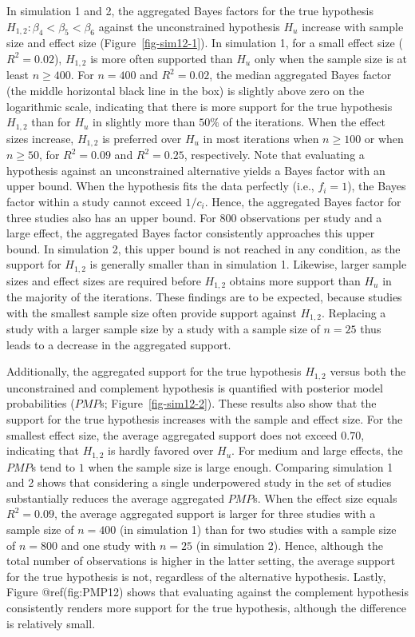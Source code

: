 \documentclass[
  authoryear,
  preprint,
  5p,
  twocolumn]{elsarticle}
\begin{document}
In simulation 1 and 2, the aggregated Bayes factors for the true
hypothesis \(H_{1,2}: \beta_4 < \beta_5 < \beta_6\) against the
unconstrained hypothesis \(H_u\) increase with sample size and effect
size (Figure~\ref{fig-sim12-1}). In simulation 1, for a small effect
size (\(R^2 = 0.02\)), \(H_{1,2}\) is more often supported than \(H_u\)
only when the sample size is at least \(n \geq 400\). For \(n = 400\)
and \(R^2 = 0.02\), the median aggregated Bayes factor (the middle
horizontal black line in the box) is slightly above zero on the
logarithmic scale, indicating that there is more support for the true
hypothesis \(H_{1,2}\) than for \(H_u\) in slightly more than \(50\%\)
of the iterations. When the effect sizes increase, \(H_{1,2}\) is
preferred over \(H_u\) in most iterations when \(n \geq 100\) or when
\(n \geq 50\), for \(R^2 = 0.09\) and \(R^2 = 0.25\), respectively. Note
that evaluating a hypothesis against an unconstrained alternative yields
a Bayes factor with an upper bound. When the hypothesis fits the data
perfectly (i.e., \(f_i = 1\)), the Bayes factor within a study cannot
exceed \(1/c_i\). Hence, the aggregated Bayes factor for three studies
also has an upper bound. For \(800\) observations per study and a large
effect, the aggregated Bayes factor consistently approaches this upper
bound. In simulation 2, this upper bound is not reached in any
condition, as the support for \(H_{1,2}\) is generally smaller than in
simulation 1. Likewise, larger sample sizes and effect sizes are
required before \(H_{1,2}\) obtains more support than \(H_u\) in the
majority of the iterations. These findings are to be expected, because
studies with the smallest sample size often provide support against
\(H_{1,2}\). Replacing a study with a larger sample size by a study with
a sample size of \(n = 25\) thus leads to a decrease in the aggregated
support.

Additionally, the aggregated support for the true hypothesis \(H_{1,2}\)
versus both the unconstrained and complement hypothesis is quantified
with posterior model probabilities (\(PMP\)s; Figure~\ref{fig-sim12-2}).
These results also show that the support for the true hypothesis
increases with the sample and effect size. For the smallest effect size,
the average aggregated support does not exceed \(0.70\), indicating that
\(H_{1,2}\) is hardly favored over \(H_u\). For medium and large
effects, the \(PMP\)s tend to \(1\) when the sample size is large
enough. Comparing simulation 1 and 2 shows that considering a single
underpowered study in the set of studies substantially reduces the
average aggregated \(PMP\)s. When the effect size equals \(R^2 = 0.09\),
the average aggregated support is larger for three studies with a sample
size of \(n = 400\) (in simulation 1) than for two studies with a sample
size of \(n = 800\) and one study with \(n = 25\) (in simulation 2).
Hence, although the total number of observations is higher in the latter
setting, the average support for the true hypothesis is not, regardless
of the alternative hypothesis. Lastly, Figure @ref(fig:PMP12) shows that
evaluating against the complement hypothesis consistently renders more
support for the true hypothesis, although the difference is relatively
small.
\end{document}
